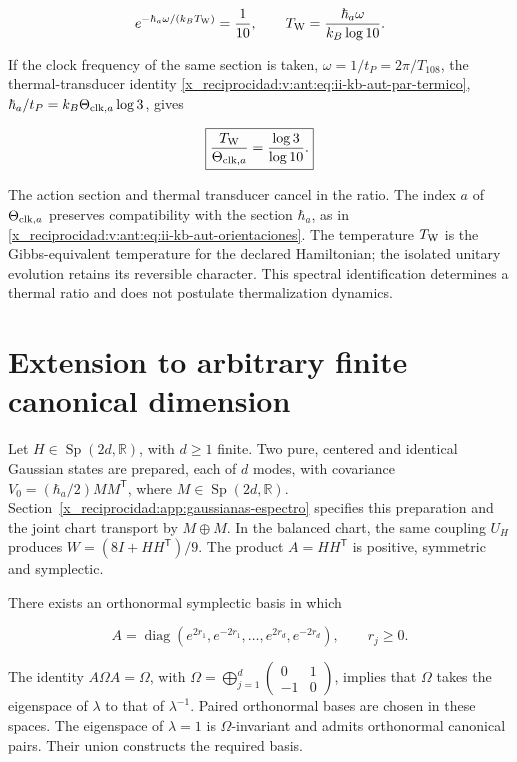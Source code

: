 \[
e^{-\hbar_a\omega/(k_BT_{\rm W})}=\frac1{10},\qquad
T_{\rm W}=\frac{\hbar_a\omega}{k_B\log10}.
\]



If the clock frequency of the same section is taken, \(\omega=1/t_P=2\pi/T_{108}\), the thermal-transducer identity \eqref{x_reciprocidad:v:ant:eq:ii-kb-aut-par-termico}, \(\hbar_a/t_P=k_B\Theta_{{\rm clk},a}\log3\), gives



\begin{equation}
\boxed{\frac{T_{\rm W}}{\Theta_{{\rm clk},a}}=\frac{\log3}{\log10}.}
\label{x_reciprocidad:nuc12:eq:5.11}
\end{equation}



The action section and thermal transducer cancel in the ratio. The index \(a\) of \(\Theta_{{\rm clk},a}\) preserves compatibility with the section \(\hbar_a\), as in \eqref{x_reciprocidad:v:ant:eq:ii-kb-aut-orientaciones}. The temperature \(T_{\rm W}\) is the Gibbs-equivalent temperature for the declared Hamiltonian; the isolated unitary evolution retains its reversible character. This spectral identification determines a thermal ratio and does not postulate thermalization dynamics.

\section{Extension to arbitrary finite canonical dimension}

Let \(H\in\operatorname{Sp}(2d,\mathbb R)\), with \(d\geq1\) finite. Two pure, centered and identical Gaussian states are prepared, each of \(d\) modes, with covariance \(V_0=(\hbar_a/2)MM^{\mathsf T}\), where \(M\in\operatorname{Sp}(2d,\mathbb R)\). Section~\ref{x_reciprocidad:app:gaussianas-espectro} specifies this preparation and the joint chart transport by \(M\oplus M\). In the balanced chart, the same coupling \(U_H\) produces \(W=(8I+HH^{\mathsf T})/9\). The product \(A=HH^{\mathsf T}\) is positive, symmetric and symplectic.

There exists an orthonormal symplectic basis in which


\[
A=\operatorname{diag}(e^{2r_1},e^{-2r_1},\ldots,
e^{2r_d},e^{-2r_d}),\qquad r_j\ge0.
\]



The identity \(A\Omega A=\Omega\), with \(\Omega=\bigoplus_{j=1}^d\left(\begin{smallmatrix}0&1\\-1&0\end{smallmatrix}\right)\), implies that \(\Omega\) takes the eigenspace of \(\lambda\) to that of \(\lambda^{-1}\). Paired orthonormal bases are chosen in these spaces. The eigenspace of \(\lambda=1\) is \(\Omega\)-invariant and admits orthonormal canonical pairs. Their union constructs the required basis.

